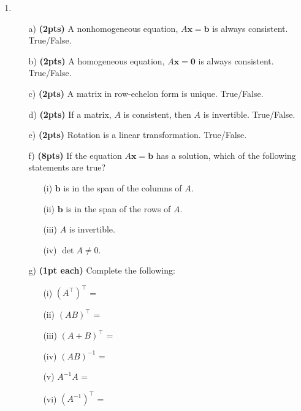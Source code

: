 \documentclass[12pt]{article}%
\begin{document}
\begin{enumerate}
\newpage

\item
\begin{itemize}
    \item[a)]\textbf{(2pts)} A nonhomogeneous equation, \(A\mathbf{x}=\mathbf{b}\) is always consistent. True/False.
    \vspace{.5cm}
    \item[b)]\textbf{(2pts)} A homogeneous equation, \(A\mathbf{x}=\mathbf{0}\) is always consistent. True/False.
    \vspace{.5cm}
    \item[c)]\textbf{(2pts)} A matrix in row-echelon form is unique. True/False.
    \vspace{.5cm}
    \item[d)]\textbf{(2pts)} If a matrix, \(A\) is consistent, then \(A\) is invertible. True/False.
    \vspace{.5cm}
    \item[e)]\textbf{(2pts)} Rotation is a linear transformation. True/False.
    \vspace{.5cm}
    \item[f)]\textbf{(8pts)} If the equation \(A\mathbf{x} = \mathbf{b}\) has a solution, which of the following statements are true?
    \begin{itemize}
        \item[(i)] \(\mathbf{b}\) is in the span of the columns of \(A\).
        \vspace{.5cm}
        \item[(ii)] \(\mathbf{b}\) is in the span of the rows of \(A\).
        \vspace{.5cm}
        \item[(iii)] \(A\) is invertible.
        \vspace{.5cm}
        \item[(iv)] \(\det A \neq 0\).
        \vspace{.5cm}
    \end{itemize}
    \item[g)]\textbf{(1pt each)} Complete the following:
    \begin{multicols}{2}
        \begin{itemize}
        \item[(i)] \((A^{\top})^{\top}\) =  
        \vspace{.5cm}
        \item[(ii)] \((AB)^{\top}\) =  
        \vspace{.5cm}
        \item[(iii)] \((A+B)^{\top}\) =  
        \vspace{.5cm}
        \item[(iv)]  \((AB)^{-1}\) =
        \vspace{.5cm}
        \item[(v)] \(A^{-1}A\) =
        \vspace{.5cm}
        \item [(vi)] \((A^{-1})^{\top}\) =
        \vspace{.5cm}
    \end{itemize}
    \end{multicols}
\end{itemize}
    

\end{enumerate}
\end{document}
